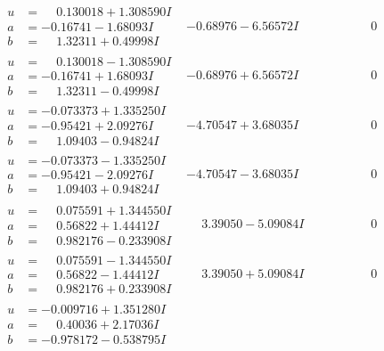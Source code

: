 \documentclass[1p]{elsarticle_modified}
\theoremstyle{definition}
\begin{document}
$$\begin{array}{c|c|c}
 \hline 
\begin{aligned}
u &= \phantom{-}0.130018 + 1.308590 I \\
a &= -0.16741 - 1.68093 I \\
b &= \phantom{-}1.32311 + 0.49998 I\end{aligned}
 & -0.68976 - 6.56572 I & \phantom{-0.000000 } 0 \\ \hline\begin{aligned}
u &= \phantom{-}0.130018 - 1.308590 I \\
a &= -0.16741 + 1.68093 I \\
b &= \phantom{-}1.32311 - 0.49998 I\end{aligned}
 & -0.68976 + 6.56572 I & \phantom{-0.000000 } 0 \\ \hline\begin{aligned}
u &= -0.073373 + 1.335250 I \\
a &= -0.95421 + 2.09276 I \\
b &= \phantom{-}1.09403 - 0.94824 I\end{aligned}
 & -4.70547 + 3.68035 I & \phantom{-0.000000 } 0 \\ \hline\begin{aligned}
u &= -0.073373 - 1.335250 I \\
a &= -0.95421 - 2.09276 I \\
b &= \phantom{-}1.09403 + 0.94824 I\end{aligned}
 & -4.70547 - 3.68035 I & \phantom{-0.000000 } 0 \\ \hline\begin{aligned}
u &= \phantom{-}0.075591 + 1.344550 I \\
a &= \phantom{-}0.56822 + 1.44412 I \\
b &= \phantom{-}0.982176 - 0.233908 I\end{aligned}
 & \phantom{-}3.39050 - 5.09084 I & \phantom{-0.000000 } 0 \\ \hline\begin{aligned}
u &= \phantom{-}0.075591 - 1.344550 I \\
a &= \phantom{-}0.56822 - 1.44412 I \\
b &= \phantom{-}0.982176 + 0.233908 I\end{aligned}
 & \phantom{-}3.39050 + 5.09084 I & \phantom{-0.000000 } 0 \\ \hline\begin{aligned}
u &= -0.009716 + 1.351280 I \\
a &= \phantom{-}0.40036 + 2.17036 I \\
b &= -0.978172 - 0.538795 I\end{aligned}

\end{array}$$
\end{document}
